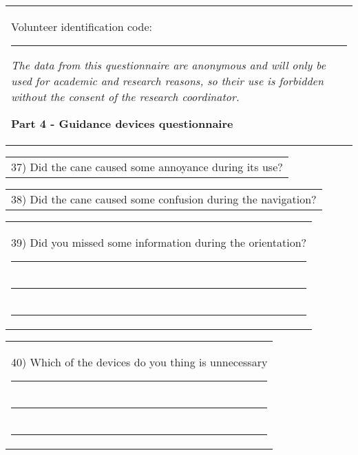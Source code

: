 \begin{table}[!thb]
    \begin{tabular}{m{1\linewidth}}

        {\color{gray}

        Volunteer identification code: \rule{1in}{.2mm}
        
        \textit{The data from this questionnaire are anonymous and will only be used for academic and research reasons, so their use is forbidden without the consent of the research coordinator.}
        }
        
        \begin{center}
        \textbf{Part 4 - Guidance devices questionnaire}
        \end{center}
        
    \end{tabular}
%

    \begin{tabular}{m{1\linewidth}}
        \vspace{1ex}
        37)	Did the cane caused some annoyance during its use?
    \end{tabular}

    
    

    \begin{tabular}{m{1\linewidth}}
        \vspace{1ex}
        38)	Did the cane caused some confusion during the navigation?
    \end{tabular}

    
    

    \begin{tabular}{m{1\linewidth}}
        \vspace{1ex}
        39)	Did you missed some information during the orientation?

        \noindent
        \rule{6in}{.2mm} \\
        \rule{6in}{.2mm} \\
        \rule{6in}{.2mm}

    \end{tabular}

    \begin{tabular}{m{1\linewidth}}
        40)	Which of the devices do you thing is unnecessary

        \noindent
        \rule{6in}{.2mm} \\
        \rule{6in}{.2mm} \\
        \rule{6in}{.2mm}

    \end{tabular}
\end{table}

\pagebreak